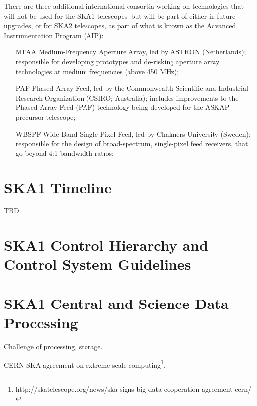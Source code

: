 \documentclass[a4paper,
               biblatex,       %
               keeplastbox,    %
               ]{jacow-2_1}    %
\begin{document}
There are three additional international consortia working on technologies that will not be used for the SKA1 telescopes, but will be part of either in future upgrades, or for SKA2 telescopes, as part of what is known as the Advanced Instrumentation Program (AIP):

\begin{itemize}
	\item[MFAA] Medium-Frequency Aperture Array, led by ASTRON (Netherlands); responsible for developing prototypes and de-risking aperture array technologies at medium frequencies (above 450 MHz);
	\item[PAF] Phased-Array Feed, led by the Commonwealth Scientific and Industrial Research Organization (CSIRO; Australia); includes improvements to the Phased-Array Feed (PAF) technology being developed for the ASKAP precursor telescope;
	\item[WBSPF] Wide-Band Single Pixel Feed, led by Chalmers University (Sweden); responsible for the design of broad-spectrum, single-pixel feed receivers, that go beyond 4:1 bandwidth ratios;
\end{itemize}


\section{SKA1 Timeline} %
\label{sec:ska1_timeline}
TBD.
 

\section{SKA1 Control Hierarchy and Control System Guidelines} %
\label{sec:ska1_control_hierarchy_and_control_system_guidelines}


\section{SKA1 Central and Science Data Processing} %
\label{sec:ska1_central_and_science_data_processing}

Challenge of processing, storage.

CERN-SKA agreement on extreme-scale computing\footnote{http://skatelescope.org/news/ska-signs-big-data-cooperation-agreement-cern/}.
\end{document}
